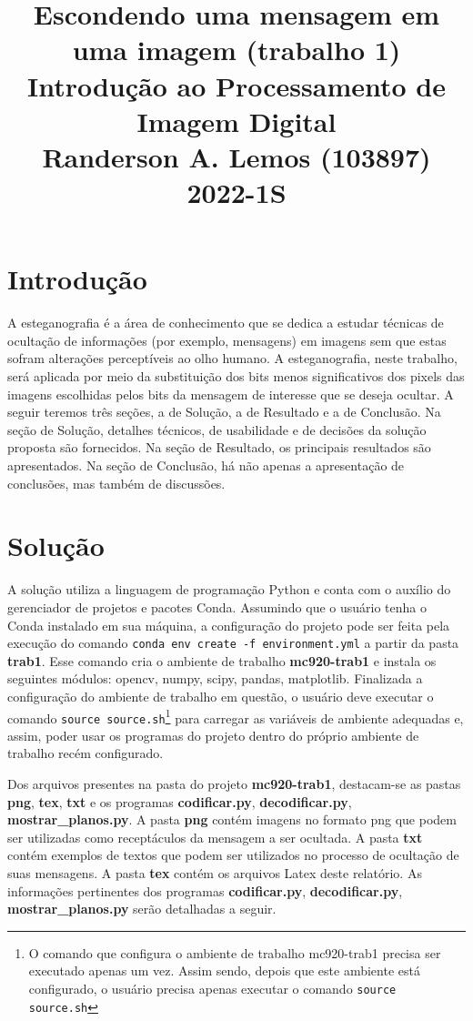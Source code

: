 \documentclass{article}
\title{
	Escondendo uma mensagem em uma imagem (trabalho 1) \\
	\Large Introdução ao Processamento de Imagem Digital \\
	Randerson A. Lemos (103897)
	2022-1S
}
\date{\vspace{-5ex}}
\begin{document}
  \maketitle

\section{Introdução}
A esteganografia é a área de conhecimento que se dedica a estudar técnicas de ocultação de informações (por exemplo, mensagens) em imagens sem que estas sofram alterações perceptíveis ao olho humano. A esteganografia, neste trabalho, será aplicada por meio da substituição dos bits menos significativos dos pixels das imagens escolhidas pelos bits da mensagem de interesse que se deseja ocultar. A seguir teremos três seções, a de Solução, a de Resultado e a de Conclusão. Na seção de Solução, detalhes técnicos, de usabilidade e de decisões da solução proposta são fornecidos. Na seção de Resultado, os principais resultados são apresentados. Na seção de Conclusão, há não apenas a apresentação de conclusões, mas também de discussões.

\section{Solução}
A solução utiliza a linguagem de programação Python e conta com o auxílio do gerenciador de projetos e pacotes Conda. Assumindo que o usuário tenha o Conda instalado em sua máquina, a configuração do projeto pode ser feita pela execução do comando \lstinline{conda env create -f environment.yml} a partir da pasta \textbf{trab1}. Esse comando cria o ambiente de trabalho \textbf{mc920-trab1} e instala os seguintes módulos: opencv, numpy, scipy, pandas, matplotlib. Finalizada a configuração do ambiente de trabalho em questão, o usuário deve executar o comando \lstinline{source source.sh}\footnote{O comando que configura o ambiente de trabalho mc920-trab1 precisa ser executado apenas um vez. Assim sendo, depois que este ambiente está configurado, o usuário precisa apenas executar o comando \lstinline{source source.sh}} para carregar as variáveis de ambiente adequadas e, assim, poder usar os programas do projeto dentro do próprio ambiente de trabalho recém configurado. 

Dos arquivos presentes na pasta do projeto \textbf{mc920-trab1}, destacam-se as pastas \textbf{png}, \textbf{tex}, \textbf{txt} e os programas \textbf{codificar.py}, \textbf{decodificar.py}, \textbf{mostrar\_planos.py}. A pasta \textbf{png} contém imagens no formato png que podem ser utilizadas como receptáculos da mensagem a ser ocultada. A pasta \textbf{txt} contém exemplos de textos que podem ser utilizados no processo de ocultação de suas mensagens. A pasta \textbf{tex} contém os arquivos Latex deste relatório. As informações pertinentes dos programas \textbf{codificar.py}, \textbf{decodificar.py}, \textbf{mostrar\_planos.py} serão detalhadas a seguir.
\end{document}
